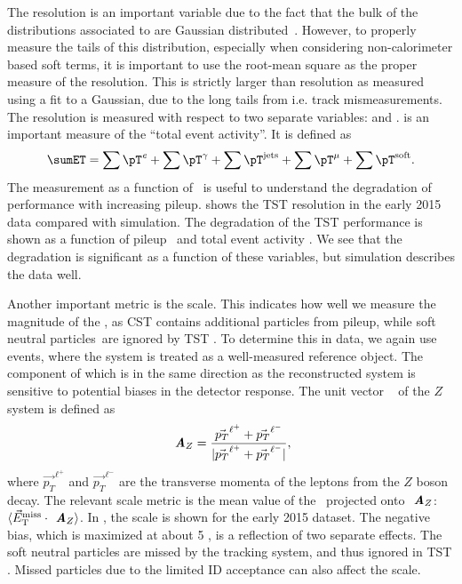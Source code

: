 The \met resolution is an important variable due to the fact that the bulk of the distributions associated to  are Gaussian distributed~\cite{Aad:2016nrq}.
However, to properly measure the tails of this distribution, especially when considering non-calorimeter based soft terms, it is important to use the root-mean square as the proper measure of the resolution.
This is strictly larger than resolution as measured using a fit to a Gaussian, due to the long tails from i.e. track mismeasurements.
The resolution is measured with respect to two separate variables: \sumET and \npv.
\sumET is an important measure of the ``total event activity''.
It is defined as
\begin{equation}
  \sumET =
  \sum \pT^{\text{\textit{e}}}       +
  \sum \pT^{\mathrm{\gamma}}   +
  \sum \pT^{\text{jets}}      +
  \sum \pT^{\mathrm{\mu}}     +
  \sum \pT^{\text{soft}}.
 \label{eq:sumet}
\end{equation}
The measurement as a function of \npv~is useful to understand the degradation of \met performance with increasing pileup.
 shows the TST \met resolution in the early 2015 data compared with simulation.
The degradation of the TST \met performance is shown as a function of pileup \npv~and total event activity \sumET.
We see that the degradation is significant as a function of these variables, but simulation describes the data well.

Another important metric is the \met scale.
This indicates how well we measure the magnitude of the \met, as CST \met contains additional particles from pileup, while soft neutral particles\footnotemark~are ignored by TST \met.
To determine this in data, we again use \Zmm events, where the \Zmm system is treated as a well-measured reference object.
The component of \met which is in the same direction as the reconstructed \Zmm system is sensitive to potential biases in the detector response.
The unit vector \Az~ of the $Z$ system is defined as
\begin{equation}
\mathbf { \textbf{ \textit {A}}}_Z =\frac{\vec{p_T}^{\ell^+}+\vec{p_T}^{\ell^-}}{|\vec{p_T}^{\ell^+}+\vec{p_T}^{\ell^-}|},
\end{equation}
where $\vec{p_T}^{\ell^+}$ and $\vec{p_T}^{\ell^-}$ are the transverse momenta of the leptons from the $Z$ boson decay.
The relevant scale metric is the mean value of the \metvec~projected onto $\mathbf { \textbf{ \textit {A}}}_Z$:  $\langle\vec{E}_{\mathrm{T}}^{\mathrm{miss}}\cdot \mathbf { \textbf{ \textit {A}}}_Z \rangle$.
In , the scale is shown for the early 2015 dataset.
The negative bias, which is maximized at about 5 \GeV, is a reflection of two separate effects.
The soft neutral particles are missed by the tracking system, and thus ignored in TST \met.
Missed particles due to the limited ID acceptance can also affect the scale.


